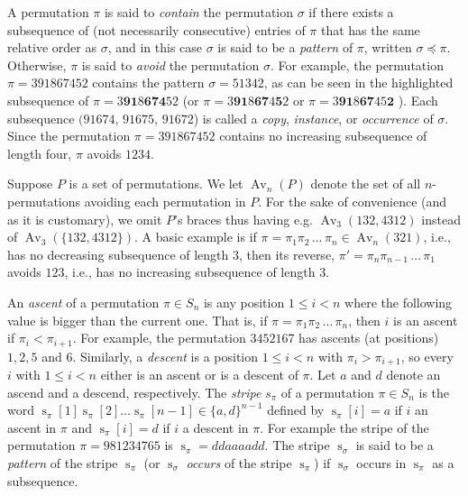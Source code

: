 \documentclass[a4paper]{llncs}
\DeclareMathOperator{\AV}{Av}
\DeclareMathOperator{\stripea}{s}
\newcommand{\stripe}[2]{\stripea_{{#1}}[{#2}]}
\newcommand{\stripew}[1]{\stripea_{{#1}}}
\newcommand{\dstep}{d}
\newcommand{\ustep}{a}
\begin{document}
A permutation $\pi$ is said to \emph{contain} the permutation $\sigma$
if there exists a subsequence of (not necessarily consecutive)
entries of $\pi$ that has the same relative order as $\sigma$,
and in this case $\sigma$ is said to be a \emph{pattern} of
$\pi$, written $\sigma \preceq \pi$.
Otherwise, $\pi$ is said to \emph{avoid} the permutation $\sigma$.
For example, the permutation $\pi = 391867452$
contains the pattern $\sigma = 51342$,
as can be seen in the highlighted subsequence of
$\pi = 3\mathbf{9}\mathbf{1}8\mathbf{6}\mathbf{7}\mathbf{4}52$
(or
$\pi = 3\mathbf{9}\mathbf{1}8\mathbf{6}\mathbf{7}4\mathbf{5}2$
or
$\pi = 3\mathbf{9}\mathbf{1}8\mathbf{6}\mathbf{7}45\mathbf{2}$
).
Each subsequence $(91674$,
$91675$,
$91672$) is called a
\emph{copy},
\emph{instance}, or
\emph{occurrence} of $\sigma$.
Since the permutation $\pi = 391867452$  contains no increasing subsequence of length four, $\pi$ avoids $1234$.

Suppose $P$ is a set of permutations. We let $\AV_n(P)$ denote the
set of all $n$-permutations avoiding each permutation in $P$.
For the sake of convenience
(and as it is customary), we omit $P$'s braces thus having
e.g. $\AV_3(132,4312)$ instead of
$\AV_3(\{132,4312\})$.
A basic example is if
$\pi = \pi_1\pi_2\,\ldots\,\pi_n \in \AV_n(321)$, i.e.,
has no decreasing subsequence of length $3$, then its reverse,
$\pi' = \pi_n\pi_{n-1}\,\ldots\,\pi_1$ avoids $123$, i.e.,
has no increasing subsequence of length $3$.

An \emph{ascent} of a permutation $\pi \in S_n$ is any position
$1 \leq i < n$ where the following value is bigger than the current one.
That is, if $\pi = \pi_1\pi_2\,\ldots\,\pi_n$, then
$i$ is an ascent if $\pi_i < \pi_{i+1}$.
For example, the permutation
$345216$7 has ascents (at positions) $1,2,5$ and $6$.
Similarly, a \emph{descent} is a position
$1 \leq i < n$ with $\pi_i > \pi_{i+1}$,
so every $i$ with $1 \leq i < n$ either is an ascent or is a descent of
$\pi$.
Let $\ustep$ and $\dstep$ denote an ascend and a descend, respectively.
The \emph{stripe} $s_\pi$ of a permutation $\pi \in S_n$ is the word
$\stripe{\pi}{1} \stripe{\pi}{2} \ldots \stripe{\pi}{n-1} \in \{\ustep,\dstep\}^{n-1}$
defined by
$ \stripe{\pi}{i}= \ustep$ if $i$ an ascent in $\pi$ and
$\stripe{\pi}{i} = \dstep$ if $i$ a descent in $\pi$.
For example the stripe of the permutation
$\pi = 981234765$
is $\stripew{\pi} = \dstep\dstep\ustep\ustep\ustep\ustep\dstep\dstep$.
The stripe $\stripew{\sigma}$ is said to be a \emph{pattern} of the stripe $\stripew{\pi}$
(or $\stripew{\sigma}$ \emph{occurs} of the stripe $\stripew{\pi}$)
if $\stripew{\sigma}$ occurs in $\stripew{\pi}$ as a subsequence.
\end{document}
